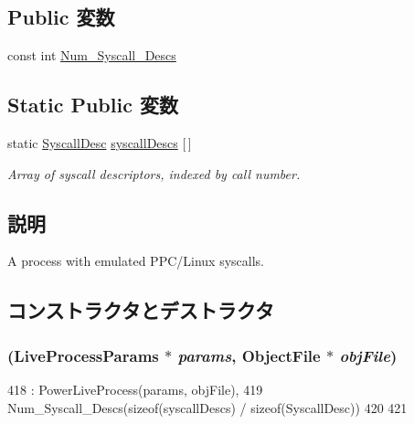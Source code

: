 \subsection*{Public 変数}
\begin{DoxyCompactItemize}
\item 
const int \hyperlink{classPowerLinuxProcess_a9534988905c6f5c8c57c4b6a7b179fea}{Num\_\-Syscall\_\-Descs}
\end{DoxyCompactItemize}
\subsection*{Static Public 変数}
\begin{DoxyCompactItemize}
\item 
static \hyperlink{classSyscallDesc}{SyscallDesc} \hyperlink{classPowerLinuxProcess_a08d67a94820b75842e07f030e548372e}{syscallDescs} \mbox{[}$\,$\mbox{]}
\begin{DoxyCompactList}\small\item\em Array of syscall descriptors, indexed by call number. \item\end{DoxyCompactList}\end{DoxyCompactItemize}


\subsection{説明}
A process with emulated PPC/Linux syscalls. 

\subsection{コンストラクタとデストラクタ}
\hypertarget{classPowerLinuxProcess_ac5aac042846f3ca8ede0428ef2267eed}{
\subsubsection[{PowerLinuxProcess}]{ (LiveProcessParams $\ast$ {\em params}, \/  {\bf ObjectFile} $\ast$ {\em objFile})}}
\label{classPowerLinuxProcess_ac5aac042846f3ca8ede0428ef2267eed}



\begin{DoxyCode}
418     : PowerLiveProcess(params, objFile),
419      Num_Syscall_Descs(sizeof(syscallDescs) / sizeof(SyscallDesc))
420 {
421 }
\end{DoxyCode}


